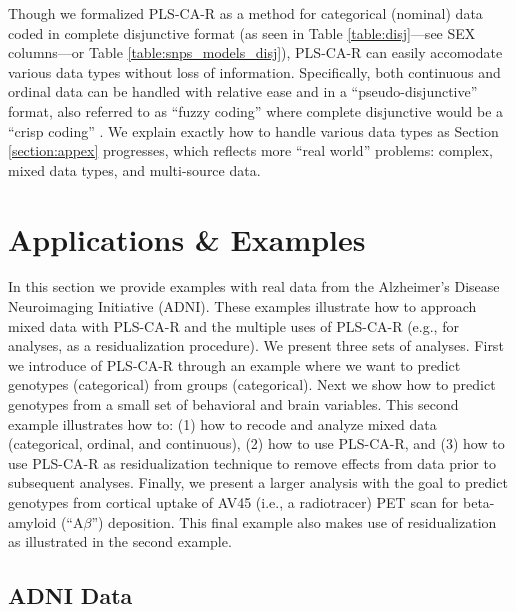 \documentclass[12pt]{article}
\begin{document}
Though we formalized PLS-CA-R as a method for categorical (nominal) data
coded in complete disjunctive format (as seen in Table
\ref{table:disj}---see SEX columns---or Table
\ref{table:snps_models_disj}), PLS-CA-R can easily accomodate various
data types without loss of information. Specifically, both continuous
and ordinal data can be handled with relative ease and in a
``pseudo-disjunctive'' format, also referred to as ``fuzzy coding''
where complete disjunctive would be a ``crisp coding''
\citep{greenacrefuzzy}. We explain exactly how to handle various data
types as Section \ref{section:appex} progresses, which reflects more
``real world'' problems: complex, mixed data types, and multi-source
data.

\hypertarget{applications-examples}{%
\section{Applications \& Examples}\label{applications-examples}}

\label{section:appex}

In this section we provide examples with real data from the Alzheimer's
Disease Neuroimaging Initiative (ADNI). These examples illustrate how to
approach mixed data with PLS-CA-R and the multiple uses of PLS-CA-R
(e.g., for analyses, as a residualization procedure). We present three
sets of analyses. First we introduce of PLS-CA-R through an example
where we want to predict genotypes (categorical) from groups
(categorical). Next we show how to predict genotypes from a small set of
behavioral and brain variables. This second example illustrates how to:
(1) how to recode and analyze mixed data (categorical, ordinal, and
continuous), (2) how to use PLS-CA-R, and (3) how to use PLS-CA-R as
residualization technique to remove effects from data prior to
subsequent analyses. Finally, we present a larger analysis with the goal
to predict genotypes from cortical uptake of AV45 (i.e., a radiotracer)
PET scan for beta-amyloid (``A\(\beta\)'') deposition. This final
example also makes use of residualization as illustrated in the second
example.

\hypertarget{adni-data}{%
\subsection{ADNI Data}\label{adni-data}}

\label{section:data}
\end{document}
